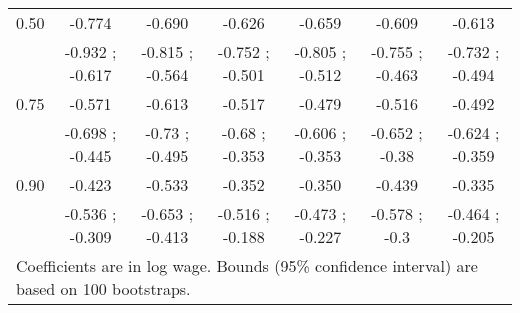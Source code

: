 \begin{table}[tb]
{\begin{tabular}{lcccccc}
0.50 & -0.774 & -0.690 & -0.626 & -0.659 & -0.609 & -0.613\\
& -0.932 ; -0.617 & -0.815 ; -0.564 & -0.752 ; -0.501 & -0.805 ; -0.512 & -0.755 ; -0.463 & -0.732 ; -0.494\\

0.75 & -0.571 & -0.613 & -0.517 & -0.479 & -0.516 & -0.492\\
& -0.698 ; -0.445 & -0.73 ; -0.495 & -0.68 ; -0.353 & -0.606 ; -0.353 & -0.652 ; -0.38 & -0.624 ; -0.359\\

0.90 & -0.423 & -0.533 & -0.352 & -0.350 & -0.439 & -0.335\\
& -0.536 ; -0.309 & -0.653 ; -0.413 & -0.516 ; -0.188 & -0.473 ; -0.227 & -0.578 ; -0.3 & -0.464 ; -0.205\\
\midrule
\midrule
\multicolumn{7}{l}{\footnotesize{Coefficients are in log wage. Bounds (95\% confidence interval) are based on 100 bootstraps.}} \\
\end{tabular}}
\label{tab:adjDecom}
\end{table}
